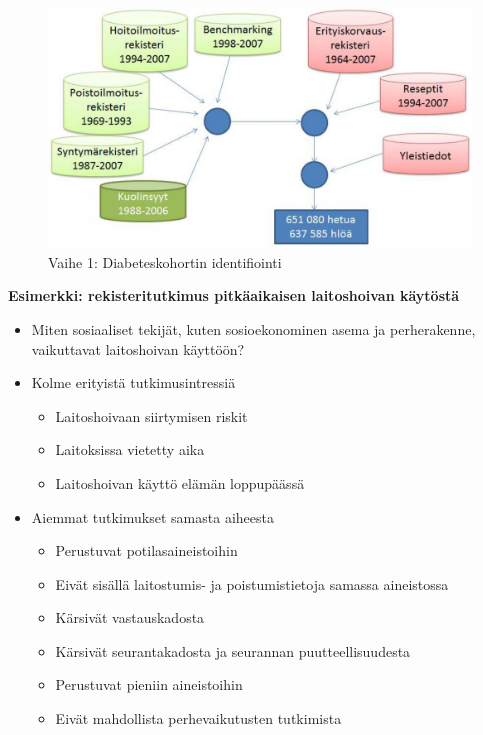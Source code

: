 \documentclass[
]{book}
\providecommand{\tightlist}{%
  \setlength{\itemsep}{0pt}\setlength{\parskip}{0pt}}
\begin{document}
\FloatBarrier

\begin{figure}

{\centering \includegraphics[width=1\linewidth]{images/diab} 

}

\caption{Vaihe 1: Diabeteskohortin identifiointi}\label{fig:diab}
\end{figure}

\FloatBarrier

\begin{eblock}{}

\textbf{Esimerkki: rekisteritutkimus pitkäaikaisen laitoshoivan käytöstä}

\begin{itemize}
\tightlist
\item
  Miten sosiaaliset tekijät, kuten sosioekonominen asema ja perherakenne, vaikuttavat laitoshoivan käyttöön?
\item
  Kolme erityistä tutkimusintressiä

  \begin{itemize}
  \tightlist
  \item
    Laitoshoivaan siirtymisen riskit
  \item
    Laitoksissa vietetty aika
  \item
    Laitoshoivan käyttö elämän loppupäässä
  \end{itemize}
\item
  Aiemmat tutkimukset samasta aiheesta

  \begin{itemize}
  \tightlist
  \item
    Perustuvat potilasaineistoihin
  \item
    Eivät sisällä laitostumis- ja poistumistietoja samassa aineistossa
  \item
    Kärsivät vastauskadosta
  \item
    Kärsivät seurantakadosta ja seurannan puutteellisuudesta
  \item
    Perustuvat pieniin aineistoihin
  \item
    Eivät mahdollista perhevaikutusten tutkimista
  \end{itemize}
\end{itemize}

\end{eblock}
\end{document}
